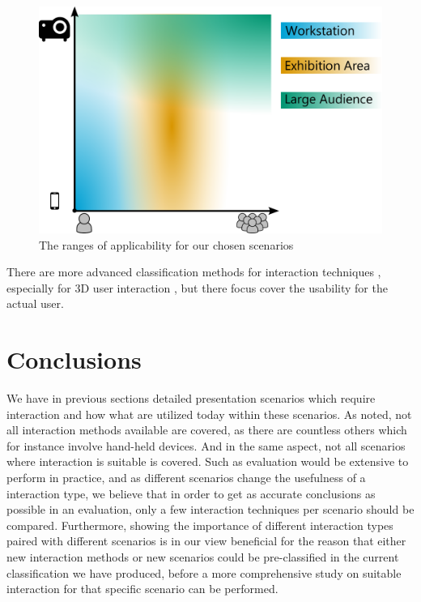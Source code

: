 \documentclass[review,journal]{vgtc}         %
\begin{document}
\begin{figure}[htb]
	\centering
	\includegraphics[width=1.0\linewidth]{expressivity.pdf}
	\caption{The ranges of applicability for our chosen scenarios}
	\label{scenario_diagram}
\end{figure}

There are more advanced classification methods for interaction techniques \cite{stars:65-93:2012}, especially for 3D user interaction \cite{CGF:CGF194, Kettner95aclassification, 978-3-319-07458-0_1}, but there focus cover the usability for the actual user.

\section{Conclusions}\label{sec:conclusion}

We have in previous sections detailed presentation scenarios which require interaction and how what are utilized today within these scenarios. As noted, not all interaction methods available are covered, as there are countless others which for instance involve hand-held devices. And in the same aspect, not all scenarios where interaction is suitable is covered. Such as evaluation would be extensive to perform in practice, and as different scenarios change the usefulness of a interaction type, we believe that in order to get as accurate conclusions as possible in an evaluation, only a few interaction techniques per scenario should be compared. Furthermore, showing the importance of different interaction types paired with different scenarios is in our view beneficial for the reason that either new interaction methods or new scenarios could be pre-classified in the current classification we have produced, before a more comprehensive study on suitable interaction for that specific scenario can be performed.
\end{document}
